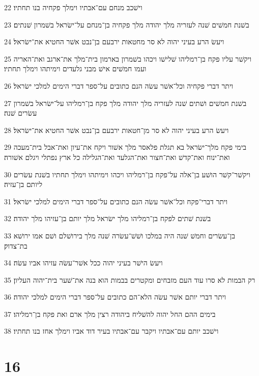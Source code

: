 \par 22 וישׁכב מנחם עם־אבתיו וימלך פקחיה בנו תחתיו׃
\par 23 בשׁנת חמשׁים שׁנה לעזריה מלך יהודה מלך פקחיה בן־מנחם על־ישׂראל בשׁמרון שׁנתים׃
\par 24 ויעשׂ הרע בעיני יהוה לא סר מחטאות ירבעם בן־נבט אשׁר החטיא את־ישׂראל׃
\par 25 ויקשׁר עליו פקח בן־רמליהו שׁלישׁו ויכהו בשׁמרון בארמון בית־מלך את־ארגב ואת־האריה ועמו חמשׁים אישׁ מבני גלעדים וימיתהו וימלך תחתיו׃
\par 26 ויתר דברי פקחיה וכל־אשׁר עשׂה הנם כתובים על־ספר דברי הימים למלכי ישׂראל׃
\par 27 בשׁנת חמשׁים ושׁתים שׁנה לעזריה מלך יהודה מלך פקח בן־רמליהו על־ישׂראל בשׁמרון עשׂרים שׁנה׃
\par 28 ויעשׂ הרע בעיני יהוה לא סר מן־חטאות ירבעם בן־נבט אשׁר החטיא את־ישׂראל׃
\par 29 בימי פקח מלך־ישׂראל בא תגלת פלאסר מלך אשׁור ויקח את־עיון ואת־אבל בית־מעכה ואת־ינוח ואת־קדשׁ ואת־חצור ואת־הגלעד ואת־הגלילה כל ארץ נפתלי ויגלם אשׁורה׃
\par 30 ויקשׁר־קשׁר הושׁע בן־אלה על־פקח בן־רמליהו ויכהו וימיתהו וימלך תחתיו בשׁנת עשׂרים ליותם בן־עזיה׃
\par 31 ויתר דברי־פקח וכל־אשׁר עשׂה הנם כתובים על־ספר דברי הימים למלכי ישׂראל׃
\par 32 בשׁנת שׁתים לפקח בן־רמליהו מלך ישׂראל מלך יותם בן־עזיהו מלך יהודה׃
\par 33 בן־עשׂרים וחמשׁ שׁנה היה במלכו ושׁשׁ־עשׂרה שׁנה מלך בירושׁלם ושׁם אמו ירושׁא בת־צדוק׃
\par 34 ויעשׂ הישׁר בעיני יהוה ככל אשׁר־עשׂה עזיהו אביו עשׂה׃
\par 35 רק הבמות לא סרו עוד העם מזבחים ומקטרים בבמות הוא בנה את־שׁער בית־יהוה העליון׃
\par 36 ויתר דברי יותם אשׁר עשׂה הלא־הם כתובים על־ספר דברי הימים למלכי יהודה׃
\par 37 בימים ההם החל יהוה להשׁליח ביהודה רצין מלך ארם ואת פקח בן־רמליהו׃
\par 38 וישׁכב יותם עם־אבתיו ויקבר עם־אבתיו בעיר דוד אביו וימלך אחז בנו תחתיו׃

\chapter{16}

